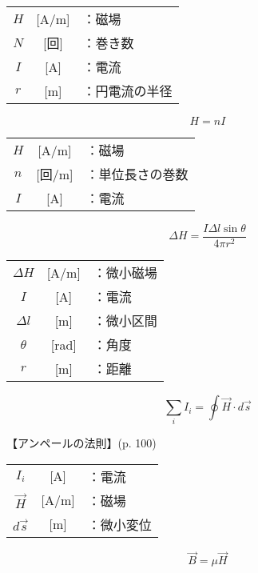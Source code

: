 \documentclass[10pt]{jarticle}
\begin{document}
\begin{tabular}{ccl}
$H$	&[A/m]	&：磁場 \\
$N$	&[回]	&：巻き数 \\
$I$	&[A]	&：電流 \\
$r$	&[m]	&：円電流の半径
\end{tabular}





\newpage
\[
H = n I
\]


\vskip3mm
\noindent
{}

\begin{tabular}{ccl}
$H$	&[A/m]	&：磁場 \\
$n$	&[回/m]	&：単位長さの巻数\\
$I$	&[A]	&：電流 \\
\end{tabular}





\newpage
\[
\mathit{\Delta} H = \frac{I \mathit{\Delta}l \sin\theta}{4\pi r^2}
\]


\vskip3mm
\noindent
{}


\begin{tabular}{ccl}
$\mathit{\Delta} H$	&[A/m]	&：微小磁場 \\
$I$	&[A]	&：電流\\
$\mathit{\Delta} l$	&[m]	&：微小区間\\
$\theta$	&[rad]	&：角度\\
$r$	&[m]	&：距離
\end{tabular}




\newpage
\[
\sum_i I_i = \oint \vec{H} \cdot d \vec{s}
\]


\vskip3mm
\noindent
【アンペールの法則】\hfill {\footnotesize (p. 100)}

\begin{tabular}{ccl}
$I_i$	&[A]	&：電流\\
$\vec{H}$	&[A/m]	&：磁場\\
$d \vec{s}$	&[m]	&：微小変位
\end{tabular}




\newpage
\[
\vec{B} = \mu \vec{H}
\]
\end{document}
